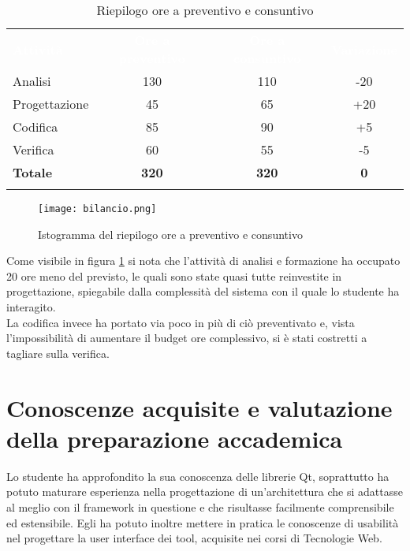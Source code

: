\begin{center}
	\begin{longtable}{p{3.2cm}!{\color{white}\vrule width 0.5mm}c!{\color{white}\vrule width 0.5mm}c!{\color{white}\vrule width 0.5mm}c!{\color{white}\vrule width 0.5mm}}
		\textcolor{white}{\textbf{Attività}}&\textcolor{white}{\textbf{Ore a preventivo}}&\textcolor{white}{\textbf{Ore a consuntivo}} & \textcolor{white}{\textbf{Variazione}} \\
		
		 Analisi & 130 & 110 & -20\\
		 Progettazione & 45 & 65 & +20\\
		 Codifica & 85 & 90 & +5\\
		 Verifica & 60 & 55 & -5\\
		 \textbf{Totale} & \textbf{320} & \textbf{320} & \textbf{0}\\
		\caption{Riepilogo ore a preventivo e consuntivo}
	\end{longtable}
\end{center}

\begin{figure}[h!] 
	\centering 
	\texttt{[image: bilancio.png]} 
	\caption{Istogramma del riepilogo ore a preventivo e consuntivo}
	\label{fig:istoBilancio}
\end{figure}

Come visibile in figura \ref{fig:istoBilancio} si nota che l'attività di analisi e formazione ha occupato 20 ore meno del previsto, le quali sono state quasi tutte reinvestite in progettazione, spiegabile dalla complessità del sistema con il quale lo studente ha interagito.\\

La codifica invece ha portato via poco in più di ciò preventivato e, vista l'impossibilità di aumentare il budget ore complessivo, si è stati costretti a tagliare sulla verifica.

\section{Conoscenze acquisite e valutazione della preparazione accademica}

Lo studente ha approfondito la sua conoscenza delle librerie Qt\textsuperscript{\textregistered}, soprattutto ha potuto maturare esperienza nella progettazione di un'architettura che si adattasse al meglio con il framework in questione e che risultasse facilmente comprensibile ed estensibile. Egli ha potuto inoltre mettere in pratica le conoscenze di usabilità nel progettare la user interface dei tool, acquisite nei corsi di Tecnologie Web.\\

